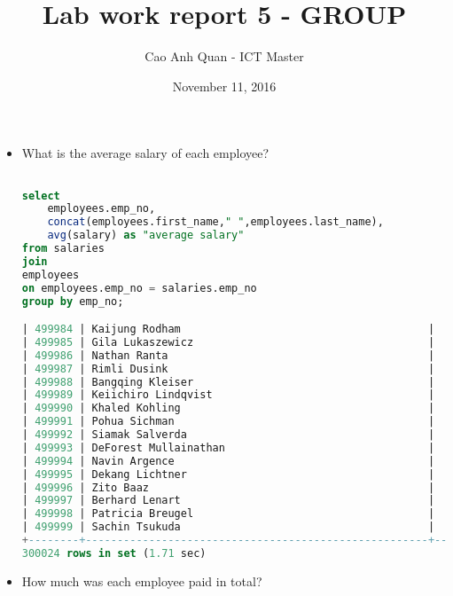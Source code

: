 \documentclass[12pt]{article}
\title{Lab work report 5 - GROUP}
\author{Cao Anh Quan - ICT Master}
\date{November 11, 2016}
\begin{document}
 
\begin{titlepage}
\maketitle
\end{titlepage}

\begin{itemize}

\item What is the average salary of each employee?
\begin{lstlisting}[language=SQL]

select  
	employees.emp_no, 
	concat(employees.first_name," ",employees.last_name),
	avg(salary) as "average salary" 
from salaries
join
employees
on employees.emp_no = salaries.emp_no
group by emp_no;

| 499984 | Kaijung Rodham                                       |     54431.2143 |
| 499985 | Gila Lukaszewicz                                     |     43500.6667 |
| 499986 | Nathan Ranta                                         |    105961.7059 |
| 499987 | Rimli Dusink                                         |     54279.6667 |
| 499988 | Bangqing Kleiser                                     |     86700.7143 |
| 499989 | Keiichiro Lindqvist                                  |     68260.4000 |
| 499990 | Khaled Kohling                                       |     43325.0000 |
| 499991 | Pohua Sichman                                        |     47829.5000 |
| 499992 | Siamak Salverda                                      |     64179.7500 |
| 499993 | DeForest Mullainathan                                |     40944.6667 |
| 499994 | Navin Argence                                        |     40000.0000 |
| 499995 | Dekang Lichtner                                      |     45891.6667 |
| 499996 | Zito Baaz                                            |     63134.1429 |
| 499997 | Berhard Lenart                                       |     66475.8667 |
| 499998 | Patricia Breugel                                     |     46665.5556 |
| 499999 | Sachin Tsukuda                                       |     70625.0000 |
+--------+------------------------------------------------------+----------------+
300024 rows in set (1.71 sec)


\end{lstlisting}


\item How much was each employee paid in total?
\begin{lstlisting}[language=SQL]


\end{lstlisting}
\end{itemize}
\end{document}
